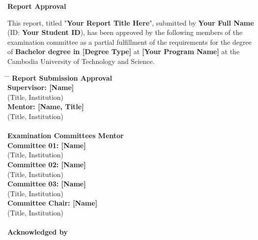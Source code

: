 \newpage
\thispagestyle{empty}

\begin{center}
    
    {\huge \textbf{Report Approval}} \\[1.5cm]
    
    \begin{minipage}{0.9\textwidth}
    \onehalfspacing
    This report, titled "\textbf{Your Report Title Here}", submitted by \textbf{Your Full Name} (ID: \textbf{Your Student ID}), has been approved by the following members of the examination committee as a partial fulfillment of the requirements for the degree of \textbf{Bachelor degree in [Degree Type]} at \textbf{ [Your Program Name]} at the Cambodia University of Technology and Science.
    \end{minipage}
    
    \vspace{1cm}
    
    
\begin{tabbing}
    \hspace{5cm} \= \hspace{6cm} \= \hspace{4cm} \kill
    \Large \textbf{Report Submission Approval} \> \> \\[0.5cm]
        \textbf{Supervisor\hspace{1.2cm}: [Name]}  \> \>\underline{\hspace{4cm}}  \\
        (Title, Institution) \\
    
        \textbf{Mentor: [Name, Title]}  \> \>\underline{\hspace{4cm}} \\
        (Title, Institution) 
\\
\vspace{0.2cm}
\\
   \Large \textbf{Examination Committees Mentor} \> \> \\[0.5cm]
    
    \textbf{Committee 01: [Name]}  \> \>\underline{\hspace{4cm}}  \\ 
    (Title, Institution) \\
    \textbf{Committee 02: [Name]}  \> \>\underline{\hspace{4cm}}  \\ 
    (Title, Institution) \\
    \textbf{Committee 03: [Name]}  \> \>\underline{\hspace{4cm}}  \\ 
    (Title, Institution) \\
    \textbf{Committee Chair: [Name]}  \> \>\underline{\hspace{4cm}} \\
    (Title, Institution)
\\
\vspace{0.2cm}
\\
    \Large \textbf{Acknowledged by} \> \> \\[0.5cm]


\end{tabbing}
\end{center}

